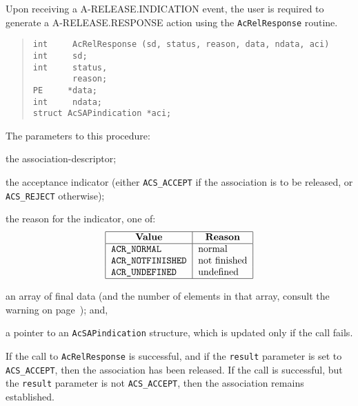 Upon receiving a {\sf A-RELEASE.INDICATION\/} event,
the user is required to generate a {\sf A-RELEASE.RESPONSE\/} action
using the \verb"AcRelResponse" routine.
\begin{quote}\small\begin{verbatim}
int     AcRelResponse (sd, status, reason, data, ndata, aci)
int     sd;
int     status,
        reason;
PE     *data;
int     ndata;
struct AcSAPindication *aci;
\end{verbatim}\end{quote}
The parameters to this procedure:
\begin{describe}
\item[\verb"sd":] the association-descriptor;

\item[\verb"status":] the acceptance indicator
(either \verb"ACS_ACCEPT" if the association is to be released,
or \verb"ACS_REJECT" otherwise);

\item[\verb"reason":] the reason for the indicator,
one of:
\[\begin{tabular}{|l|l|}
\hline
    \multicolumn{1}{|c|}{\bf Value}&
		\multicolumn{1}{c|}{\bf Reason}\\
\hline
    \tt ACR\_NORMAL&		normal\\
    \tt ACR\_NOTFINISHED&	not finished\\
    \tt ACR\_UNDEFINED&		undefined\\
\hline
\end{tabular}\]

\item[\verb"data"/\verb"ndata":] an array of final data
(and the number of elements in that array,
consult the warning on page~\pageref{AcSAPdata});
and,

\item[\verb"aci":] a pointer to an \verb"AcSAPindication" structure,
which is updated only if the call fails.
\end{describe}
If the call to \verb"AcRelResponse" is successful,
and if the \verb"result" parameter is set to \verb"ACS_ACCEPT",
then the association has been released.
If the call is successful,
but the \verb"result" parameter is not \verb"ACS_ACCEPT",
then the association remains established.

